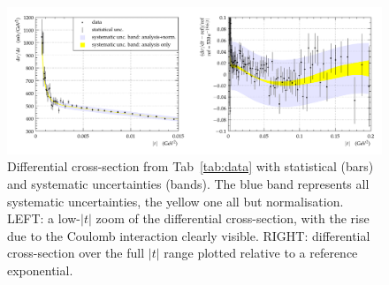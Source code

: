 \begin{figure}
\vskip-5mm
\begin{center}
\includegraphics[width=18cm]{fig/t_dist_tabulation.pdf}
\vskip-3mm
\caption{%
Differential cross-section from Tab~\ref{tab:data} with statistical (bars) and systematic uncertainties (bands). The blue band represents all systematic uncertainties, the yellow one all but normalisation. LEFT: a low-$|t|$ zoom of the differential cross-section, with the rise due to the Coulomb interaction clearly visible. RIGHT: differential cross-section over the full $|t|$ range plotted relative to a reference exponential.
}
\label{fig:dsdt}
\end{center}
\end{figure}

\begin{figure}
\begin{center}
\caption{%
}
\end{center}
\end{figure}
